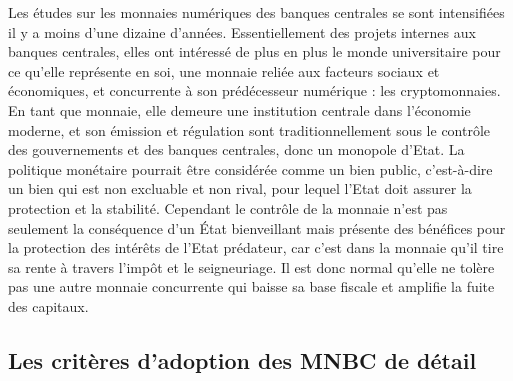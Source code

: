 \documentclass[12pt]{article}
\begin{document}
Les études sur les monnaies numériques des banques centrales se sont intensifiées il y a moins d'une dizaine d'années. Essentiellement des projets internes aux banques centrales, elles ont intéressé de plus en plus le monde universitaire pour ce qu'elle représente en soi, une monnaie reliée aux facteurs sociaux et économiques, et concurrente à son prédécesseur numérique : les cryptomonnaies. En tant que monnaie, elle demeure une institution centrale dans l'économie moderne, et son émission et régulation sont traditionnellement sous le contrôle des gouvernements et des banques centrales, donc un monopole d'Etat. La politique monétaire pourrait être considérée comme un bien public, c'est-à-dire un bien qui est non excluable et non rival, pour lequel l'Etat doit assurer la protection et la stabilité. Cependant le contrôle de la monnaie n'est pas seulement la conséquence d'un État bienveillant mais présente des bénéfices pour la protection des intérêts de l'Etat prédateur, car c'est dans la monnaie qu'il tire sa rente à travers l'impôt et le seigneuriage. Il est donc normal qu'elle ne tolère pas une autre monnaie concurrente qui baisse sa base fiscale et amplifie la fuite des capitaux.

\subsection{Les critères d'adoption des MNBC de détail}
\end{document}
